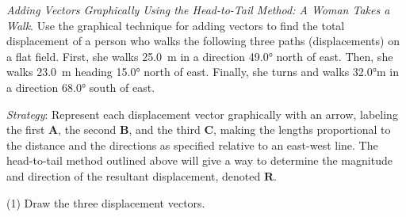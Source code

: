 \documentclass[../../main-ap-physics.tex]{subfiles}
\begin{document}
\begin{example}
    \textit{Adding Vectors Graphically Using the Head-to-Tail Method: A Woman Takes a Walk}. Use the graphical technique for adding vectors to find the total displacement of a person who walks the following three paths (displacements) on a flat field. First, she walks \SI{25.0}{m} in a direction  \ang{49.0} north of east. Then, she walks \SI{23.0}{m} heading \ang{15.0} north of east. Finally, she turns and walks \ang{32.0}{m} in a direction \ang{68.0} south of east.
\end{example}

\Solution \textit{Strategy}: Represent each displacement vector graphically with an arrow, labeling the first $\textbf{A}$, the second $\textbf{B}$, and the third  $\textbf{C}$, making the lengths proportional to the distance and the directions as specified relative to an east-west line. The head-to-tail method outlined above will give a way to determine the magnitude and direction of the resultant displacement, denoted $\textbf{R}$.

\vspace{1em}

(1) Draw the three displacement vectors.
\end{document}
